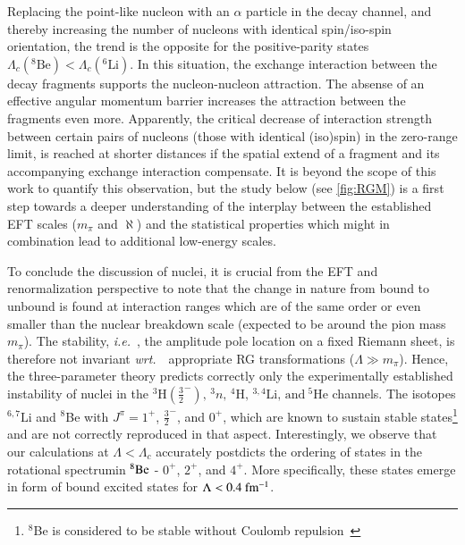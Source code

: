 \documentclass[preprint,12pt]{elsarticle}
\newcommand{\lc}{\ensuremath{\Lambda_c}}
\newcommand{\wrt}{\textit{wrt.}~}
\newcommand{\ie}{\textit{i.e.}~}
\begin{document}
 Replacing the point-like nucleon with an $\alpha$ particle
in the decay channel, and thereby increasing the number of nucleons with identical spin/iso-spin orientation, the trend is the opposite
for the positive-parity states $\lc(^8\text{Be})<\lc(^6\text{Li})$.
In this situation, the exchange interaction between the decay fragments supports the nucleon-nucleon attraction. The absense of an
effective angular momentum barrier increases the attraction between the fragments even more. Apparently, the critical decrease
of interaction strength between certain pairs of nucleons (those with identical (iso)spin) in the zero-range limit, is reached
at shorter distances if the spatial extend of a fragment and its accompanying exchange interaction compensate.
It is beyond the scope of this work to quantify this observation, but the study below (see \ref{fig:RGM}) is a first step
towards a deeper understanding of the interplay between the established EFT scales ($m_\pi$ and $\aleph$) and the statistical
properties which might in combination lead to additional low-energy scales. 

%
To conclude the discussion of nuclei, it is crucial from the EFT and renormalization perspective to note that the change in nature
from bound to unbound is found at interaction ranges which are of the same order or even smaller than
the nuclear breakdown scale (expected to be around the pion mass $m_\pi$).
The stability, \ie, the amplitude pole location on a fixed Riemann sheet, is therefore not invariant \wrt~appropriate RG transformations
($\Lambda\gg m_\pi$).
Hence, the three-parameter theory predicts correctly only the experimentally established instability of nuclei in the
$^3\text{H}(\frac{3}{2}^-),\,^3n,\,^4\text{H},\,^{3,4}\text{Li},\,\text{and}~^5\text{He}$ channels.
The isotopes $^{6,7}\text{Li}$ and $^8$Be with $J^\pi=1^+$, $\frac{3}{2}^-$, and $0^+$, which are known to sustain stable
states\footnote{$^8$Be is considered to be stable without Coulomb repulsion~\cite{AFZAL:1969zz,Higa:2008dn}}
and are not correctly reproduced in that aspect.
%
Interestingly, we observe that our calculations at $\Lambda<\lc$ accurately postdicts the ordering of states in the rotational spectrumin $\rm ^8Be$ - $0^+$, $2^+$, and $4^+$. 
More specifically, these states emerge in form of bound excited states for $\Lambda<0.4~{\rm fm^{-1}}$.
\end{document}
